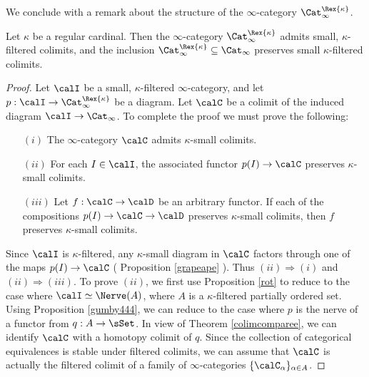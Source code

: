 We conclude with a remark about the structure of the $\infty$-category
$\Cat_{\infty}^{\Rex{\kappa}}$.

\begin{proposition}\label{unrose}
Let $\kappa$ be a regular cardinal. Then the $\infty$-category
$\Cat_{\infty}^{\Rex{\kappa}}$ admits small, $\kappa$-filtered colimits, and the inclusion 
$\Cat_{\infty}^{\Rex{\kappa}} \subseteq \Cat_{\infty}$ preserves small $\kappa$-filtered colimits.
\end{proposition}

\begin{proof}
Let $\calI$ be a small, $\kappa$-filtered $\infty$-category, and let
$p: \calI \rightarrow \Cat_{\infty}^{\Rex{\kappa}}$ be a diagram. Let $\calC$ be a colimit of the induced diagram $\calI \rightarrow \Cat_{\infty}$. 
To complete the proof we must prove the following:
\begin{itemize}
\item[$(i)$] The $\infty$-category $\calC$ admits $\kappa$-small colimits.
\item[$(ii)$] For each $I \in \calI$, the associated functor $p(I) \rightarrow \calC$ preserves $\kappa$-small colimits.
\item[$(iii)$] Let $f: \calC \rightarrow \calD$ be an arbitrary functor. If each of the compositions
$p(I) \rightarrow \calC \rightarrow \calD$ preserves $\kappa$-small colimits, then $f$ preserves $\kappa$-small colimits.
\end{itemize}

Since $\calI$ is $\kappa$-filtered, any $\kappa$-small diagram in $\calC$ factors through one of the maps $p(I) \rightarrow \calC$ ( Proposition \ref{grapeape} ). Thus $(ii) \Rightarrow (i)$ and $(ii) \Rightarrow (iii)$. To prove $(ii)$, we first use Proposition \ref{rot} to reduce to the case where $\calI \simeq \Nerve(A)$, where $A$ is a $\kappa$-filtered partially ordered set. Using Proposition \ref{gumby444}, we can reduce to the case where $p$ is the nerve of a functor from $q: A \rightarrow \sSet$. In view of Theorem \ref{colimcomparee}, we can identify $\calC$ with a homotopy colimit of $q$. Since the collection of categorical equivalences is stable under filtered colimits, we can assume that $\calC$ is actually the filtered colimit of a family of $\infty$-categories $\{ \calC_{\alpha} \}_{\alpha \in A}$. 


\end{proof}
